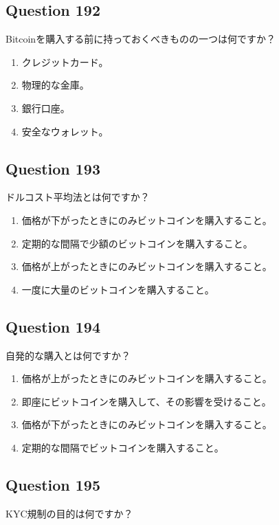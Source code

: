 \documentclass[12pt,a4paper]{article}
\begin{document}
\bigskip


\subsection*{Question 192}
Bitcoinを購入する前に持っておくべきものの一つは何ですか？

\begin{enumerate}[label=\Alph*., leftmargin=*]
\item クレジットカード。
\item 物理的な金庫。
\item 銀行口座。
\item 安全なウォレット。
\end{enumerate}

\bigskip


\subsection*{Question 193}
ドルコスト平均法とは何ですか？

\begin{enumerate}[label=\Alph*., leftmargin=*]
\item 価格が下がったときにのみビットコインを購入すること。
\item 定期的な間隔で少額のビットコインを購入すること。
\item 価格が上がったときにのみビットコインを購入すること。
\item 一度に大量のビットコインを購入すること。
\end{enumerate}

\bigskip


\subsection*{Question 194}
自発的な購入とは何ですか？

\begin{enumerate}[label=\Alph*., leftmargin=*]
\item 価格が上がったときにのみビットコインを購入すること。
\item 即座にビットコインを購入して、その影響を受けること。
\item 価格が下がったときにのみビットコインを購入すること。
\item 定期的な間隔でビットコインを購入すること。
\end{enumerate}

\bigskip


\subsection*{Question 195}
KYC規制の目的は何ですか？
\end{document}

